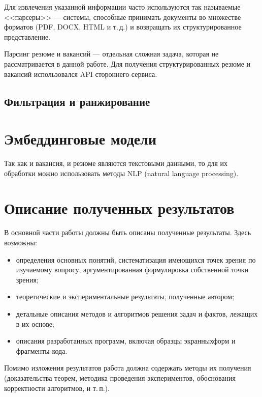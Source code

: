 \documentclass[14pt]{mmcs_article}
\begin{document}
Для извлечения указанной информации часто используются так называемые <<парсеры>> --- системы, способные принимать документы во множестве форматов (PDF, DOCX, HTML и т.\,д.) и возвращать их структурированное представление.

Парсинг резюме и вакансий --- отдельная сложная задача, которая не рассматривается в данной работе. Для получения структурированных резюме и вакансий использовался API стороннего сервиса.

\subsection{Фильтрация и ранжирование}




\newpage
\section{Эмбеддинговые модели}\label{embedding_models}

Так как и вакансия, и резюме являются текстовыми данными, то для их обработки можно использовать методы NLP (natural language processing).




\newpage
\section{Описание полученных результатов}\label{dsfs}

В основной части работы должны быть описаны полученные результаты. Здесь возможны:
\begin{itemize}
  \item определения основных понятий, систематизация имеющихся точек зрения по изучаемому вопросу, аргументированная формулировка собственной точки зрения;
  \item теоретические и экспериментальные результаты, полученные автором;
  \item детальные описания методов и алгоритмов решения задач и фактов, лежащих в их основе;
  \item описания разработанных программ, включая образцы экранных\linebreak форм и фрагменты кода.
\end{itemize}

Помимо изложения результатов работа должна содержать методы их получения (доказательства теорем, методика проведения экспериментов, обоснования корректности алгоритмов, и т.\,п.).
\end{document}

